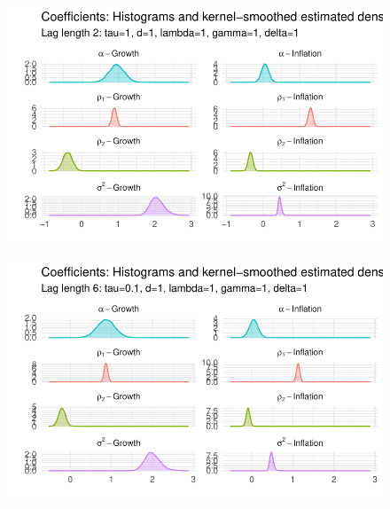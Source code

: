 \documentclass[
  letterpaper,
]{book}
\begin{document}
\begin{figure}

{\centering \includegraphics{./BVAR_files/figure-pdf/unnamed-chunk-9-2.pdf}

}

\end{figure}

\begin{figure}

{\centering \includegraphics{./BVAR_files/figure-pdf/unnamed-chunk-9-3.pdf}

}

\end{figure}
\end{document}
